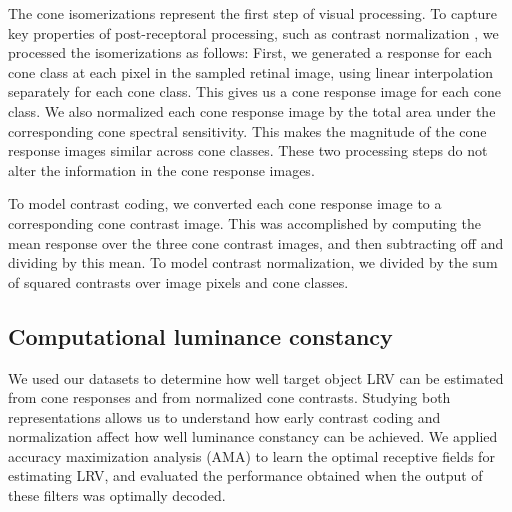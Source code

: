 \documentclass{jov}
\begin{document}
%
%

%

% 


The cone isomerizations represent the first step of visual processing.
To capture key properties of post-receptoral processing, such as contrast normalization \cite{heeger1992normalization,albrecht1991motion,carandini2012normalization},
we processed the isomerizations as follows:
First, we generated a response for each cone class at each pixel in the sampled retinal image, using linear interpolation separately for each cone class.
This gives us a cone response image for each cone class.
We also normalized each cone response image by the total area under the corresponding cone spectral sensitivity.
This makes the magnitude of the cone response images similar across cone classes.
These two processing steps do not alter the information in the cone response images. 

To model contrast coding, we converted each cone response image to a corresponding cone contrast image.
This was accomplished by computing the mean response over the three cone contrast images, and then subtracting off and dividing by this mean.
To model contrast normalization, we divided by the sum of squared contrasts over image pixels and cone classes.

\subsection{Computational luminance constancy} \label{method:SupervisedLearning}
We used our datasets to determine how well target object LRV can be estimated from cone responses and from normalized cone contrasts.
Studying both representations allows us to understand how early contrast coding and normalization affect how well luminance constancy can be achieved.
We applied accuracy maximization analysis (AMA) to learn the optimal receptive fields for estimating LRV,
and evaluated the performance obtained when the output of these filters was optimally decoded.
\end{document}
